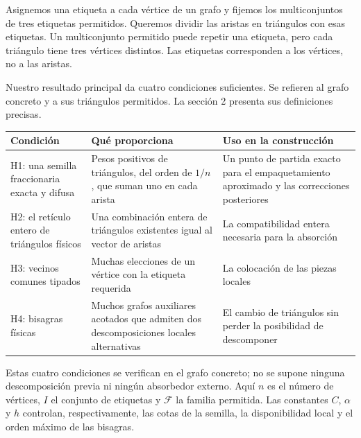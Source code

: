 \documentclass[spanish,11pt,a4paper]{article}
\begin{document}
Asignemos una etiqueta a cada vértice de un grafo y fijemos los multiconjuntos de tres etiquetas permitidos. Queremos dividir las aristas en triángulos con esas etiquetas. Un multiconjunto permitido puede repetir una etiqueta, pero cada triángulo tiene tres vértices distintos. Las etiquetas corresponden a los vértices, no a las aristas.

Nuestro resultado principal da cuatro condiciones suficientes. Se refieren al grafo concreto y a sus triángulos permitidos. La sección 2 presenta sus definiciones precisas.

{\begin{longtable}[]{@{}
  >{\raggedright\arraybackslash}p{}
  >{\raggedright\arraybackslash}p{}
  >{\raggedright\arraybackslash}p{}@{}}
\toprule\noalign{}
\begin{minipage}[b]{\linewidth}\raggedright
Condición
\end{minipage} & \begin{minipage}[b]{\linewidth}\raggedright
Qué proporciona
\end{minipage} & \begin{minipage}[b]{\linewidth}\raggedright
Uso en la construcción
\end{minipage} \\
\midrule\noalign{}
\endhead
\bottomrule\noalign{}
\endlastfoot
H1: una semilla fraccionaria exacta y difusa & Pesos positivos de triángulos, del orden de \(1/n\), que suman uno en cada arista & Un punto de partida exacto para el empaquetamiento aproximado y las correcciones posteriores \\
H2: el retículo entero de triángulos físicos & Una combinación entera de triángulos existentes igual al vector de aristas & La compatibilidad entera necesaria para la absorción \\
H3: vecinos comunes tipados & Muchas elecciones de un vértice con la etiqueta requerida & La colocación de las piezas locales \\
H4: bisagras físicas & Muchos grafos auxiliares acotados que admiten dos descomposiciones locales alternativas & El cambio de triángulos sin perder la posibilidad de descomponer \\
\end{longtable}
}

Estas cuatro condiciones se verifican en el grafo concreto; no se supone ninguna descomposición previa ni ningún absorbedor externo. Aquí \(n\) es el número de vértices, \(I\) el conjunto de etiquetas y \(\mathcal F\) la familia permitida. Las constantes \(C\), \(\alpha\) y \(h\) controlan, respectivamente, las cotas de la semilla, la disponibilidad local y el orden máximo de las bisagras.
\end{document}
